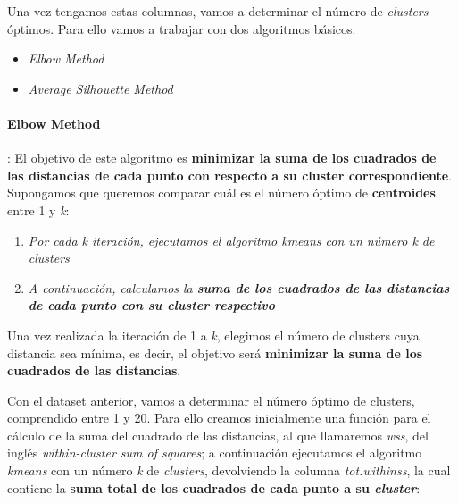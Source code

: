\documentclass [a4paper] {article}
\begin{document}
Una vez tengamos estas columnas, vamos a determinar el número de \textit{clusters} óptimos. Para ello vamos a trabajar con dos algoritmos básicos:
\begin{itemize}
  \item \textit{Elbow Method}
  \item \textit{Average Silhouette Method}
\end{itemize}

\paragraph{Elbow Method}: 
El objetivo de este algoritmo es \textbf{minimizar la suma de los cuadrados de las distancias de cada punto con respecto a su cluster correspondiente}. Supongamos que queremos comparar cuál es el número óptimo de \textbf{centroides} entre 1 y \textit{k}:

\begin{enumerate}
  \item \textit{Por cada k iteración, ejecutamos el algoritmo kmeans con un número k de clusters}
  \item \textit{A continuación, calculamos la \textbf{suma de los cuadrados de las distancias de cada punto con su cluster respectivo}}
\end{enumerate}

Una vez realizada la iteración de 1 a \textit{k}, elegimos el número de clusters cuya distancia sea mínima, es decir, el objetivo será \textbf{minimizar la suma de los cuadrados de las distancias}.

Con el dataset anterior, vamos a determinar el número óptimo de clusters, comprendido entre 1 y 20. Para ello creamos inicialmente una función para el cálculo de la suma del cuadrado de las distancias, al que llamaremos \textit{wss}, del inglés \textit{within-cluster sum of squares}; a continuación ejecutamos el algoritmo \textit{kmeans} con un número \textit{k} de \textit{clusters}, devolviendo la columna \textit{tot.withinss}, la cual contiene la \textbf{suma total de los cuadrados de cada punto a su \textit{cluster}}:

\begin{Schunk}
\end{Schunk}
\end{document}
